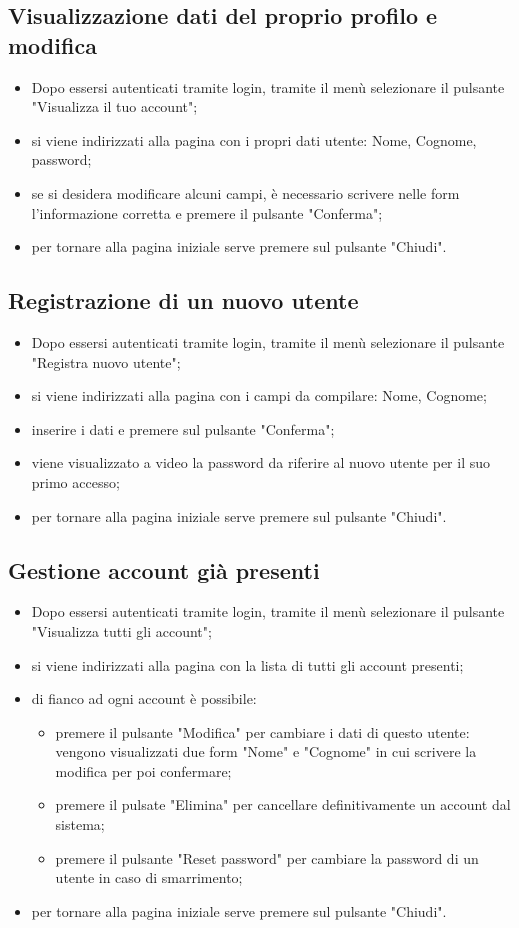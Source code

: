 \subsection{Visualizzazione dati del proprio profilo e modifica}
\begin{itemize}
    \item Dopo essersi autenticati tramite login, tramite il menù selezionare il pulsante "Visualizza il tuo account";
    \item si viene indirizzati alla pagina con i propri dati utente: Nome, Cognome, password;
    \item se si desidera modificare alcuni campi, è necessario scrivere nelle form l'informazione corretta e premere il pulsante "Conferma";
    \item per tornare alla pagina iniziale serve premere sul pulsante "Chiudi".
\end{itemize}
\subsection{Registrazione di un nuovo utente}
\begin{itemize}
    \item Dopo essersi autenticati tramite login, tramite il menù selezionare il pulsante "Registra nuovo utente";
    \item si viene indirizzati alla pagina con i campi da compilare: Nome, Cognome;
    \item inserire i dati e premere sul pulsante "Conferma";
    \item viene visualizzato a video la password da riferire al nuovo utente per il suo primo accesso;
    \item per tornare alla pagina iniziale serve premere sul pulsante "Chiudi".
\end{itemize}
\subsection{Gestione account già presenti}
\begin{itemize}
    \item Dopo essersi autenticati tramite login, tramite il menù selezionare il pulsante "Visualizza tutti gli account";
    \item si viene indirizzati alla pagina con la lista di tutti gli account presenti;
    \item di fianco ad ogni account è possibile:
        \begin{itemize}
            \item premere il pulsante "Modifica" per cambiare i dati di questo utente: vengono visualizzati due form "Nome" e "Cognome" in cui scrivere la modifica per poi confermare;
            \item premere il pulsate "Elimina" per cancellare definitivamente un account dal sistema;
            \item premere il pulsante "Reset password" per cambiare la password di un utente in caso di smarrimento;
        \end{itemize}
    \item per tornare alla pagina iniziale serve premere sul pulsante "Chiudi".
\end{itemize}
